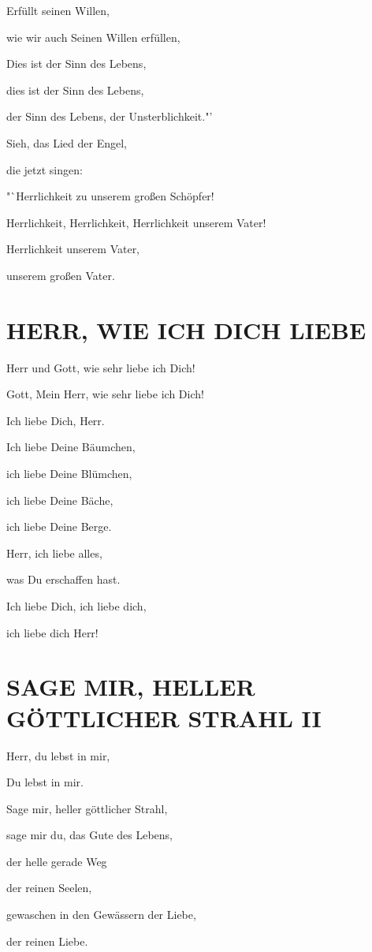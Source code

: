 \documentclass[11pt,a5paper,twoside]{article}
\begin{document}
Erfüllt seinen Willen,

wie wir auch Seinen Willen erfüllen,

Dies ist der Sinn des Lebens,

dies ist der Sinn des Lebens,

der Sinn des Lebens, der Unsterblichkeit."'

Sieh, das Lied der Engel,

die jetzt singen:

"`Herrlichkeit zu unserem großen Schöpfer!

Herrlichkeit, Herrlichkeit, Herrlichkeit unserem Vater!

Herrlichkeit unserem Vater,

unserem großen Vater.

\section[Herr, wie ich dich liebe]{HERR, WIE ICH DICH LIEBE}

Herr und Gott, wie sehr liebe ich Dich!

Gott, Mein Herr, wie sehr liebe ich Dich!

Ich liebe Dich, Herr.

Ich liebe Deine Bäumchen, 

ich liebe Deine Blümchen,

ich liebe Deine Bäche,

ich liebe Deine Berge.

Herr, ich liebe alles,

was Du erschaffen hast.

Ich liebe Dich, ich liebe dich,

ich liebe dich Herr!

\section[Sage mir, heller göttlicher Strahl]{SAGE MIR, HELLER GÖTTLICHER STRAHL II}

Herr, du lebst in mir,

Du lebst in mir.

Sage mir, heller göttlicher Strahl,

sage mir du, das Gute des Lebens, 

der helle gerade Weg

der reinen Seelen,

gewaschen in den Gewässern der Liebe,

der reinen Liebe. 
\end{document}
